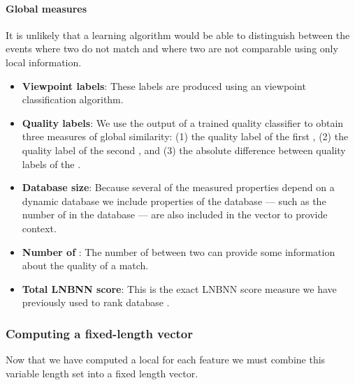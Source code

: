             \paragraph{Global measures}
            It is unlikely that a learning algorithm would be able to distinguish between the events where two
              \annots{} do not match and where two \annots{} are not comparable using only local information.
            \begin{itemize}
                \item \textbf{Viewpoint labels}:
                    These labels are produced using an \annot{} viewpoint classification algorithm.
                    
                \item \textbf{Quality labels}:
                    We use the output of a trained \annot{} quality classifier to obtain three measures of global
                      similarity:
                    (1) the quality label of the first \annot{},
                    (2) the quality label of the second \annot{}, and
                    (3) the absolute difference between quality labels of the \annots{}.
                    
                \item \textbf{Database size}:
                    Because several of the measured properties depend on a dynamic database we include properties of
                      the database --- such as the number of \annots{} in the database --- are also included in the
                      vector to provide context.
                    
                \item \textbf{Number of \correspondences{}}:
                    The number of \correspondences{} between two \annots{} can provide some information about the
                      quality of a match.
                    
                \item \textbf{Total LNBNN score}:
                    This is the exact LNBNN score measure we have previously used to rank database \annots{}.
                    
            \end{itemize}
            
        \subsubsection{Computing a fixed-length vector}
            Now that we have computed a local \matchvec{} for each feature \correspondence{} we must combine this
              variable length set into a fixed length vector.
            
